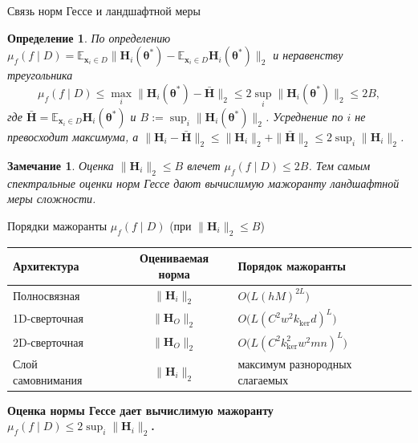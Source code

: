 \documentclass[9pt,pdf,hyperref={unicode}]{beamer}
\newtheorem{rusdefinition}{Определение}
\newtheorem{rusremark}{Замечание}
\newcommand{\key}[1]{\par\vspace{0.5ex}\noindent\textbf{\color{darkgreen}#1}}
\begin{document}
\begin{frame}{Связь норм Гессе и ландшафтной меры}
\justifying
\small
\begin{rusdefinition}
    По определению $\mu_f(f\mid D)=\mathbb{E}_{\mathbf{x}_i\in D}\bigl\|\mathbf{H}_{i}(\boldsymbol{\theta}^*)-\mathbb{E}_{\mathbf{x}_i\in D}\mathbf{H}_{i}(\boldsymbol{\theta}^*)\bigr\|_2$ и неравенству треугольника
    \[
        \mu_f(f\mid D)\le\max_i\bigl\|\mathbf{H}_{i}(\boldsymbol{\theta}^*)-\bar{\mathbf{H}}\bigr\|_2\le 2\sup_i\bigl\|\mathbf{H}_{i}(\boldsymbol{\theta}^*)\bigr\|_2\le 2B,
    \]
    где $\bar{\mathbf{H}}=\mathbb{E}_{\mathbf{x}_i\in D}\mathbf{H}_{i}(\boldsymbol{\theta}^*)$ и $B:=\sup_i\|\mathbf{H}_{i}(\boldsymbol{\theta}^*)\|_2$. Усреднение по $i$ не превосходит максимума, а $\|\mathbf{H}_i-\bar{\mathbf{H}}\|_2\le\|\mathbf{H}_i\|_2+\|\bar{\mathbf{H}}\|_2\le 2\sup_i\|\mathbf{H}_i\|_2$.
\end{rusdefinition}
\begin{rusremark}
    Оценка $\|\mathbf{H}_i\|_2\le B$ влечет $\mu_f(f\mid D)\le 2B$. Тем самым спектральные оценки норм Гессе дают вычислимую мажоранту ландшафтной меры сложности.
\end{rusremark}
\begin{block}{Порядки мажоранты $\mu_f(f\mid D)$ (при $\|\mathbf{H}_i\|_2\le B$)}
\footnotesize
\begin{tabular}{|l|c|l|}
\hline
\textbf{Архитектура} & \textbf{Оцениваемая норма} & \textbf{Порядок мажоранты} \\
\hline
Полносвязная & $\|\mathbf{H}_i\|_2$ & $O\bigl(L(hM)^{2L}\bigr)$ \\
\hline
1D-сверточная & $\|\mathbf{H}_O\|_2$ & $O\bigl(L(C^2w^2k_{\mathrm{ker}}d)^L\bigr)$ \\
\hline
2D-сверточная & $\|\mathbf{H}_O\|_2$ & $O\bigl(L(C^2k_{\mathrm{ker}}^2w^2mn)^L\bigr)$ \\
\hline
Слой самовнимания & $\|\mathbf{H}_i\|_2$ & максимум разнородных слагаемых \\
\hline
\end{tabular}
\end{block}
\key{Оценка нормы Гессе дает вычислимую мажоранту $\mu_f(f\mid D)\le 2\sup_i\|\mathbf{H}_i\|_2$.}
\end{frame}
\end{document}
